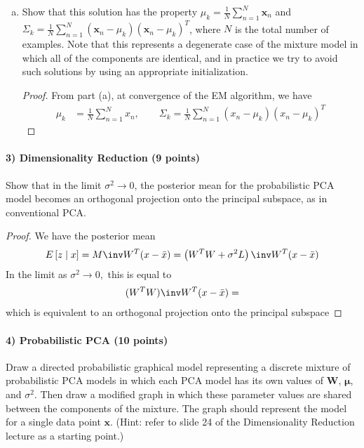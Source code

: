 \documentclass{article}
\begin{document}
\begin{enumerate}[(a)]
	\item Show that this solution has the property $\mu_k=\frac{1}{N}\sum_{n=1}^{N}\mathbf{x}_n$ and $\Sigma_k=\frac{1}{N}\sum_{n=1}^{N}(\mathbf{x}_n-\mu_k)(\mathbf{x}_n-\mu_k)^T$, where $N$ is the total number of examples. Note that this represents a degenerate case of the mixture model in which all of the components are identical, and in practice we try to avoid such solutions by using an appropriate initialization.
		\begin{proof}
			From part (a), at convergence of the EM algorithm, we have
			\begin{align*}
				\mu_k &= \frac{1}{N}\sum_{n=1}^{N} x_n, \quad\quad \Sigma_k = \frac{1}{N} \sum_{n=1}^{N} \left( x_n-\mu_k \right)\left( x_n-\mu_k \right)^T
			\end{align*}
		\end{proof}

\end{enumerate}

\paragraph{3) Dimensionality Reduction (9 points)}

Show that in the limit $\sigma^2 \rightarrow 0$, the posterior mean for the probabilistic PCA model becomes an orthogonal projection onto the principal subspace, as in conventional PCA.
\begin{proof}
	We have the posterior mean
	\begin{align*}
		E\left[ z\mid x \right] = M\inv W^T (x-\bar x) = \left( W^TW+\sigma^2L \right)\inv W^T(x-\bar x)
	\end{align*}
	In the limit as $\sigma^2\to 0,$ this is equal to
	\begin{align*}
		(W^{T}W)\inv W^T(x-\bar x) = 
	\end{align*}
	which is equivalent to an orthogonal projection onto the principal subspace
\end{proof}


\paragraph{4) Probabilistic PCA (10 points)}

Draw a directed probabilistic graphical model representing a discrete mixture of probabilistic PCA models in which each PCA model has its own values of $\mathbf{W}$, $\boldsymbol{\mu}$, and $\sigma^2$. Then draw a modified graph in which these parameter values are shared between the components of the mixture. The graph should represent the model for a single data point $\mathbf{x}$. (Hint: refer to slide 24 of the Dimensionality Reduction lecture as a starting point.)
\end{document}
